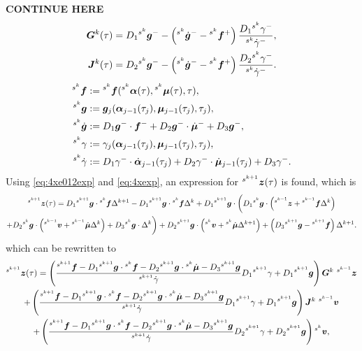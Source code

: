\documentclass[../DC2017114Bouma.tex]{subfiles}
\begin{document}
\textbf{CONTINUE HERE}
\begin{align}
\Gb^k(\tau) &= D_1\ls^{s^k}\gb^- - \left(\ls^{s^k}\dot{\gb}^- - \ls^{s^k}\fb^+\right)\frac{D_1\ls^{s^k}\gamma^-}{\ls^{s^k}\dot{\gamma}^-},\\
\Jb^k(\tau) &= D_2\ls^{s^k}\gb^- - \left(\ls^{s^k}\dot{\gb}^- - \ls^{s^k}\fb^+\right)\frac{D_2\ls^{s^k}\gamma^-}{\ls^{s^k}\dot{\gamma}^-}.
\end{align}
\begin{align*}
\ls^{s^k}\fb &:= \ls^{s^k}\fb(\ls^{s^{k}}\alphab(\tau),\ls^{s^{k}}\mub(\tau),\tau),\\
\ls^{s^k}\gb &:= \gb_{j}(\alphab_{j-1}(\tau_j),\mub_{j-1}(\tau_j),\tau_j),\\
\ls^{s^k}\dot{\gb} &:= D_1\gb^-\cdot \fb^- + D_2\gb^-\cdot \dot{\mub}^- + D_3\gb^-,\\
\ls^{s^k}\gamma &:= \gamma_j(\alphab_{j-1}(\tau_j),\mub_{j-1}(\tau_j),\tau_j),\\
\ls^{s^k}\dot{\gamma} &:= D_1\gamma^-\cdot\dot{\alphab}_{j-1}(\tau_j) + D_2\gamma^-\cdot\dot{\mub}_{j-1}(\tau_j) + D_3\gamma^-.
\end{align*}
Using \eqref{eq:4xe012exp} and \eqref{eq:4xexp}, an expression for $\ls^{s^{k+1}}\zb(\tau)$ is found, which is
\begin{multline}
\ls^{s^{k+1}}\zb(\tau) = D_1\ls^{s^{k+1}}\gb\cdot\ls^{s^{k}}\fb\Delta^{k+1} - D_1\ls^{s^{k+1}}\gb\cdot\ls^{s^{k}}\fb\Delta^{k} + D_1\ls^{s^{k+1}}\gb\cdot \bigg( D_1\ls^{s^{k}}\gb\cdot\left(\ls^{s^{k-1}}\zb+\ls^{s^{k-1}}\fb\Delta^{k}\right)\\
+D_2\ls^{s^{k}}\gb\cdot\left(\ls^{s^{k-1}}\vb+\ls^{s^{k-1}}\dot{\mub}\Delta^{k}\right)+D_3\ls^{s^{k}}\gb\cdot\Delta^{k}\bigg) + D_2 \ls^{s^{k+1}}\gb\cdot\left(\ls^{s^{k}}\vb+\ls^{s^{k}}\dot{\mub}\Delta^{k+1} \right) + \left(D_3\ls^{s^{k+1}}\gb - \ls^{s^{k+1}}\fb\right)\Delta^{k+1}.\label{eq:4ztau}
\end{multline}
which can be rewritten to 
\begin{multline}
\ls^{s^{k+1}}\zb(\tau) = \left(\frac{\ls^{s^{k+1}}\fb - D_1\ls^{s^{k+1}}\gb\cdot\ls^{s^{k}}\fb  - D_2\ls^{s^{k+1}}\gb\cdot\ls^{s^{k}}\dot{\mub} - D_3\ls^{s^{k+1}}\gb}{\ls^{s^{k+1}}\dot{\gamma}}D_1\ls^{s^{k+1}}\gamma + D_1\ls^{s^{k+1}}\gb\right)\Gb^{k}\ ^{s^{k-1}}\zb\\
+ \left(\frac{\ls^{s^{k+1}}\fb - D_1\ls^{s^{k+1}}\gb\cdot\ls^{s^{k}}\fb - D_2\ls^{s^{k+1}}\gb\cdot\ls^{s^{k}}\dot{\mub} - D_3\ls^{s^{k+1}}\gb}{\ls^{s^{k+1}}\dot{\gamma}}D_1\ls^{s^{k+1}}\gamma + D_1\ls^{s^{k+1}}\gb\right)\Jb^{k}\ ^{s^{k-1}}\vb\\
+ \left(\frac{\ls^{s^{k+1}}\fb-D_1\ls^{s^{k+1}}\gb\cdot\ls^{s^{k}}\fb - D_2\ls^{s^{k+1}}\gb\cdot\ls^{s^{k}}\dot{\mub} - D_3\ls^{s^{k+1}}\gb}{\ls^{s^{k+1}}\dot{\gamma}}D_2\ls^{s^{k+1}}\gamma + D_2\ls^{s^{k+1}}\gb\right)\ls^{s^{k}}\vb,
\end{multline}
\end{document}
